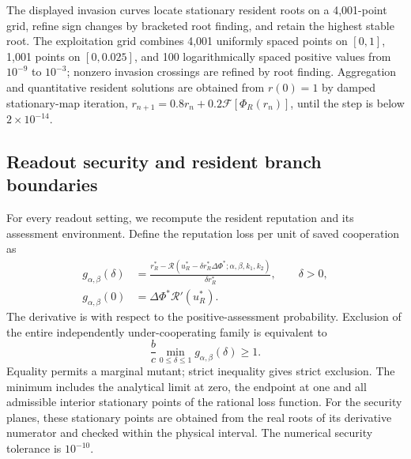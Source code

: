 \documentclass[fleqn,10pt]{article}
\begin{document}
The displayed invasion curves locate stationary resident roots on a 4,001-point grid, refine sign changes by bracketed root finding, and retain the highest stable root. The exploitation grid combines 4,001 uniformly spaced points on $[0,1]$, 1,001 points on $[0,0.025]$, and 100 logarithmically spaced positive values from $10^{-9}$ to $10^{-3}$; nonzero invasion crossings are refined by root finding. Aggregation and quantitative resident solutions are obtained from $r(0)=1$ by damped stationary-map iteration, $r_{n+1}=0.8r_n+0.2\mathcal F[\Phi_R(r_n)]$, until the step is below $2\times10^{-14}$.

\subsection*{Readout security and resident branch boundaries}

For every readout setting, we recompute the resident reputation and its assessment environment. Define the reputation loss per unit of saved cooperation as
\begin{equation}
\begin{aligned}
g_{\alpha,\beta}(\delta)
&=\frac{r_R^*-\mathcal R\!\left(u_R^*-\delta r_R^*\Delta\Phi^*;\alpha,\beta,k_1,k_2\right)}
{\delta r_R^*},\qquad \delta>0,\\
g_{\alpha,\beta}(0)&=\Delta\Phi^*\mathcal R'(u_R^*).
\end{aligned}
\label{eq:methods-readout-penalty}
\end{equation}
The derivative is with respect to the positive-assessment probability. Exclusion of the entire independently under-cooperating family is equivalent to
\begin{equation}
\frac bc\min_{0\leq\delta\leq1}g_{\alpha,\beta}(\delta)\geq1.
\label{eq:methods-global-security}
\end{equation}
Equality permits a marginal mutant; strict inequality gives strict exclusion. The minimum includes the analytical limit at zero, the endpoint at one and all admissible interior stationary points of the rational loss function. For the security planes, these stationary points are obtained from the real roots of its derivative numerator and checked within the physical interval. The numerical security tolerance is $10^{-10}$.
\end{document}
